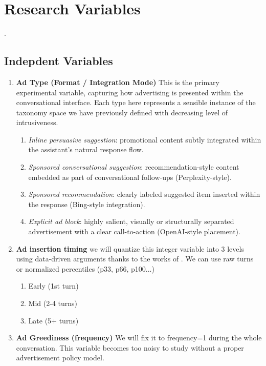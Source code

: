 \documentclass{article}
\begin{document}
\section{Research Variables}.

\subsection{Indepdent Variables}

\begin{enumerate}
    \item \textbf{Ad Type (Format / Integration Mode)}  
    This is the primary experimental variable, capturing how advertising is presented within the conversational interface. Each type here represents a sensible instance of the taxonomy space we have previously defined with decreasing level of intrusiveness.
    
    \begin{enumerate}
        \item \textit{Inline persuasive suggestion}: promotional content subtly integrated within the assistant’s natural response flow.
        
        \item \textit{Sponsored conversational suggestion}: recommendation-style content embedded as part of conversational follow-ups (Perplexity-style).
        
        \item \textit{Sponsored recommendation}: clearly labeled suggested item inserted within the response (Bing-style integration).
        
        \item \textit{Explicit ad block}: highly salient, visually or structurally separated advertisement with a clear call-to-action (OpenAI-style placement).
    \end{enumerate}

    \item \textbf{Ad insertion timing} we will quantize this integer variable into 3 levels using data-driven arguments thanks to the works of \cite{}. We can use raw turns or normalized percentiles (p33, p66, p100...)

        \begin{enumerate}
            \item Early (1st turn)
            \item Mid (2-4 turns)
            \item Late (5+ turns)
        \end{enumerate}

    \item \textbf{Ad Greediness (frequency)} We will fix it to frequency=1 during the whole conversation. This variable becomes too noisy to study without a proper advertisement policy model. 
\end{enumerate}
\end{document}
